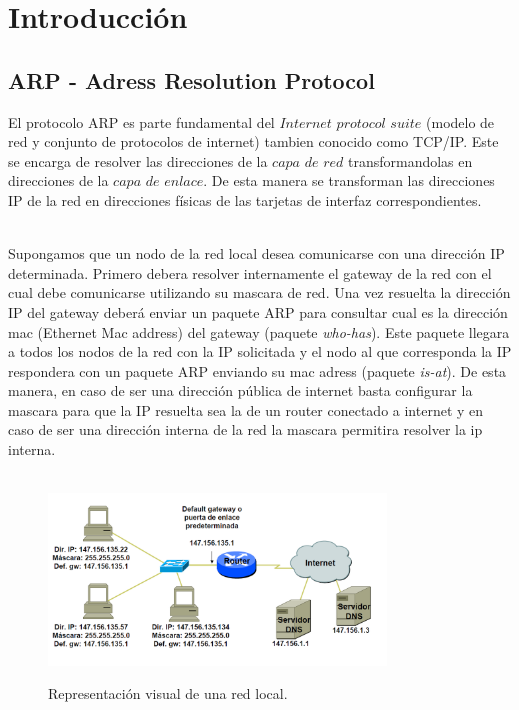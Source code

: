 \section{Introducci\'on}

\subsection{ARP - Adress Resolution Protocol}
El protocolo ARP es parte fundamental del $Internet$ $protocol$ $suite$ (modelo de red y conjunto de protocolos de internet) tambien conocido como TCP/IP. Este se encarga de resolver las direcciones de la $capa$ $de$ $red$ transformandolas en direcciones de la $capa$ $de$ $enlace$. De esta manera se transforman las
direcciones IP de la red en direcciones f\'isicas de las tarjetas de interfaz correspondientes.  \\\

Supongamos que un nodo de la red local desea comunicarse con una direcci\'on IP determinada. Primero debera resolver internamente el gateway de la red con el cual debe comunicarse utilizando su mascara de red. Una vez resuelta la direcci\'on IP del gateway deberá enviar un paquete ARP para consultar cual es la direcci\'on mac (Ethernet Mac address) del gateway (paquete \textit{who-has}). Este paquete llegara a todos los nodos de la red con la IP solicitada y el nodo al que corresponda la IP respondera con un paquete ARP enviando su mac adress (paquete \textit{is-at}). De esta manera, en caso de ser una direcci\'on p\'ublica de internet basta configurar la mascara para que la IP resuelta sea la de un router conectado a internet y en caso de ser una direcci\'on interna de la red la mascara permitira resolver la ip interna. \\\

\begin{figure}[h]
	\begin{center}
    \includegraphics[width=0.8\textwidth]{graficos/RED_LOCAL.png}
     \label{fig:RED_LOCAL} 
	\end{center}    
    \caption{Representaci\'on visual de una red local.}  
    
\end{figure}
\vspace{1cm}

